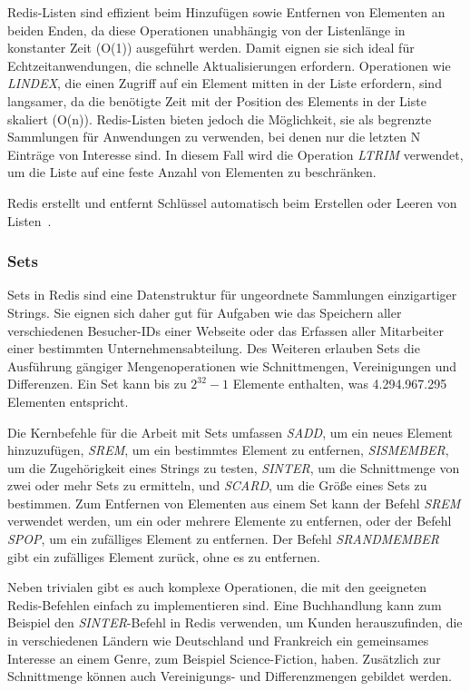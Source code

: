 Redis-Listen sind effizient beim Hinzufügen sowie Entfernen von Elementen an beiden Enden, da diese Operationen unabhängig von der Listenlänge in konstanter Zeit (O(1)) ausgeführt werden.
Damit eignen sie sich ideal für Echtzeitanwendungen, die schnelle Aktualisierungen erfordern. 
Operationen wie \emph{LINDEX}, die einen Zugriff auf ein Element mitten in der Liste erfordern, sind langsamer, da die benötigte Zeit mit der Position des Elements in der Liste skaliert (O(n)).
Redis-Listen bieten jedoch die Möglichkeit, sie als begrenzte Sammlungen für Anwendungen zu verwenden, bei denen nur die letzten N Einträge von Interesse sind.
In diesem Fall wird die Operation \emph{LTRIM} verwendet, um die Liste auf eine feste Anzahl von Elementen zu beschränken.


Redis erstellt und entfernt Schlüssel automatisch beim Erstellen oder Leeren von Listen~\cite{redis_ltd_lists_nodate}.


\subsubsection{Sets}
Sets in Redis sind eine Datenstruktur für ungeordnete Sammlungen einzigartiger Strings.
Sie eignen sich daher gut für Aufgaben wie das Speichern aller verschiedenen Besucher-IDs einer Webseite oder das Erfassen aller Mitarbeiter einer bestimmten Unternehmensabteilung.
Des Weiteren erlauben Sets die Ausführung gängiger Mengenoperationen wie Schnittmengen, Vereinigungen und Differenzen.
Ein Set kann bis zu \(2^{32} - 1\) Elemente enthalten, was 4.294.967.295 Elementen entspricht.

Die Kernbefehle für die Arbeit mit Sets umfassen \emph{SADD}, um ein neues Element hinzuzufügen, \emph{SREM}, um ein bestimmtes Element zu entfernen, \emph{SISMEMBER}, um die Zugehörigkeit eines Strings zu testen, \emph{SINTER}, um die Schnittmenge von zwei oder mehr Sets zu ermitteln, und \emph{SCARD}, um die Größe eines Sets zu bestimmen.
Zum Entfernen von Elementen aus einem Set kann der Befehl \emph{SREM} verwendet werden, um ein oder mehrere Elemente zu entfernen, oder der Befehl \emph{SPOP}, um ein zufälliges Element zu entfernen.
Der Befehl \emph{SRANDMEMBER} gibt ein zufälliges Element zurück, ohne es zu entfernen.

Neben trivialen gibt es auch komplexe Operationen, die mit den geeigneten Redis-Befehlen einfach zu implementieren sind.
Eine Buchhandlung kann zum Beispiel den \emph{SINTER}-Befehl in Redis verwenden, um Kunden herauszufinden, die in verschiedenen Ländern wie Deutschland und Frankreich ein gemeinsames Interesse an einem Genre, zum Beispiel Science-Fiction, haben.
Zusätzlich zur Schnittmenge können auch Vereinigungs- und Differenzmengen gebildet werden.

